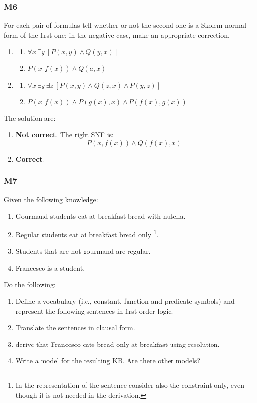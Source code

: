 \documentclass[10pt,a4paper]{article}
\begin{document}
\subsubsection{M6}
For each pair of formulas tell whether or not the second one is a Skolem normal form of the first one; in the negative case, make an appropriate correction.
\begin{enumerate}[label=(\alph*)]
\item 
	\begin{enumerate}
	\item $\forall x\ \exists y\ [P(x,y) \wedge Q(y,x)]$
	\item $ P(x,f(x)) \wedge Q(a,x)$
	\end{enumerate}
\item 
\begin{enumerate}
	\item $\forall x\ \exists y\ \exists z\ [P(x,y) \wedge Q(z,x) \wedge P(y,z)]$
	\item $ P(x,f(x))\wedge P(g(x),x) \wedge P(f(x),g(x))$
	\end{enumerate}
\end{enumerate}

The solution are:
\begin{enumerate}[label=(\alph*)]
\item \textbf{Not correct}. The right SNF is:
\[P(x,f(x)) \wedge Q(f(x),x)\]
\item \textbf{Correct}.
\end{enumerate}


\subsubsection{M7}
Given the following knowledge:
\begin{enumerate}[label=\arabic*]
\item Gourmand students eat at breakfast bread with nutella.
\item Regular students eat at breakfast bread only \footnote{In the representation of the sentence consider also the constraint only, even though it is not needed in the derivation.}.
\item Students that are not gourmand are regular.
\item  Francesco is a student.
\end{enumerate}

Do the following:
\begin{enumerate}[label=(\alph*)]
\item  Define a vocabulary (i.e., constant, function and predicate symbols) and represent the following sentences in first order logic.
\item Translate the sentences in clausal form.
\item derive that Francesco eats bread only at breakfast using resolution.
\item Write a model for the resulting KB. Are there other models?

\end{enumerate}
\end{document}
